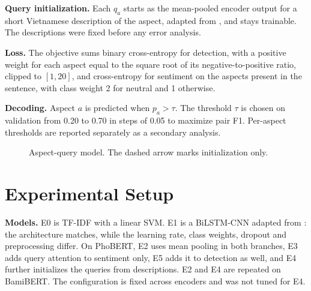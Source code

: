 \documentclass[9pt, conference, a4paper, compsocconf]{IEEEtran}
\begin{document}
\textbf{Query initialization.} Each $q_a$ starts as the mean-pooled encoder output for a short Vietnamese description of the aspect, adapted from \cite{sau2021absa}, and stays trainable. The descriptions were fixed before any error analysis.

\textbf{Loss.} The objective sums binary cross-entropy for detection, with a positive weight for each aspect equal to the square root of its negative-to-positive ratio, clipped to $[1, 20]$, and cross-entropy for sentiment on the aspects present in the sentence, with class weight 2 for neutral and 1 otherwise.

\textbf{Decoding.} Aspect $a$ is predicted when $p_a > \tau$. The threshold $\tau$ is chosen on validation from 0.20 to 0.70 in steps of 0.05 to maximize pair F1. Per-aspect thresholds are reported separately as a secondary analysis.

\begin{figure}[!t]
\centering
{}
\caption{Aspect-query model. The dashed arrow marks initialization only.}
\label{fig:model}
\end{figure}

\section{Experimental Setup}
\textbf{Models.} E0 is TF-IDF with a linear SVM. E1 is a BiLSTM-CNN \cite{hochreiter1997lstm,kim2014cnn} adapted from \cite{sau2021absa}: the architecture matches, while the learning rate, class weights, dropout and preprocessing differ. On PhoBERT, E2 uses mean pooling in both branches, E3 adds query attention to sentiment only, E5 adds it to detection as well, and E4 further initializes the queries from descriptions. E2 and E4 are repeated on BamiBERT. The configuration is fixed across encoders and was not tuned for E4.
\end{document}
